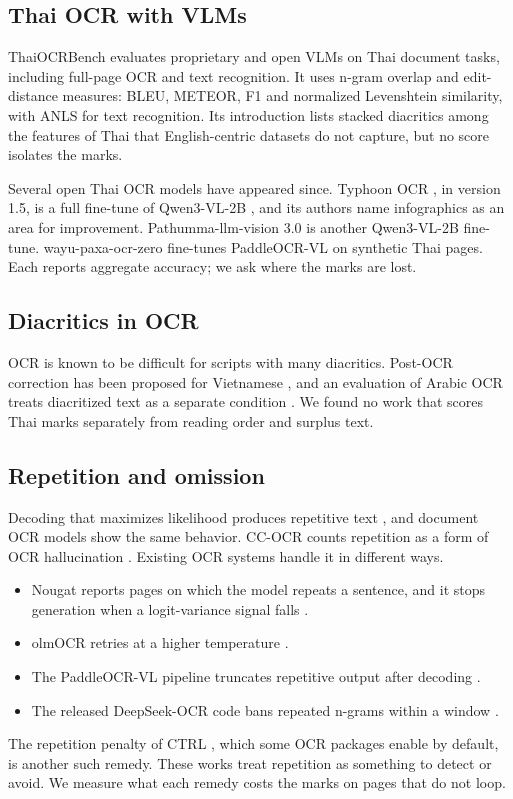 \subsection{Thai OCR with VLMs}
ThaiOCRBench \cite{nonesung2025thaiocrbench} evaluates proprietary and open VLMs on Thai document tasks, including full-page OCR and text recognition. It uses n-gram overlap and edit-distance measures: BLEU, METEOR, F1 and normalized Levenshtein similarity, with ANLS for text recognition. Its introduction lists stacked diacritics among the features of Thai that English-centric datasets do not capture, but no score isolates the marks.

Several open Thai OCR models have appeared since. Typhoon OCR \cite{nonesung2026typhoonocr}, in version 1.5, is a full fine-tune of Qwen3-VL-2B \cite{bai2025qwen3vl}, and its authors name infographics as an area for improvement. Pathumma-llm-vision 3.0 \cite{nectec2026pathumma} is another Qwen3-VL-2B fine-tune. wayu-paxa-ocr-zero \cite{pipatanakul2026synthetic} fine-tunes PaddleOCR-VL \cite{cui2025paddleocrvl} on synthetic Thai pages. Each reports aggregate accuracy; we ask where the marks are lost.

\subsection{Diacritics in OCR}
OCR is known to be difficult for scripts with many diacritics. Post-OCR correction has been proposed for Vietnamese \cite{do2025reference}, and an evaluation of Arabic OCR treats diacritized text as a separate condition \cite{elsafty2025arabic}. We found no work that scores Thai marks separately from reading order and surplus text.

\subsection{Repetition and omission}
Decoding that maximizes likelihood produces repetitive text \cite{holtzman2020curious}, and document OCR models show the same behavior. CC-OCR counts repetition as a form of OCR hallucination \cite{yang2025ccocr}. Existing OCR systems handle it in different ways.
\begin{itemize}
\item Nougat reports pages on which the model repeats a sentence, and it stops generation when a logit-variance signal falls \cite{blecher2024nougat}.
\item olmOCR retries at a higher temperature \cite{poznanski2025olmocr}.
\item The PaddleOCR-VL pipeline truncates repetitive output after decoding \cite{paddlex2025truncate}.
\item The released DeepSeek-OCR code bans repeated n-grams within a window \cite{deepseekocr2025code,wei2025deepseekocr}.
\end{itemize}
The repetition penalty of CTRL \cite{keskar2019ctrl}, which some OCR packages enable by default, is another such remedy. These works treat repetition as something to detect or avoid. We measure what each remedy costs the marks on pages that do not loop.

